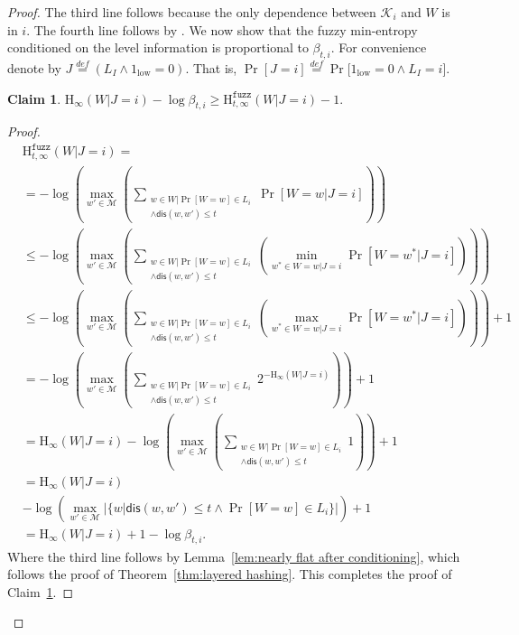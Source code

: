 \documentclass[11pt]{article}
\newtheorem{claim}[theorem]{Claim}
\newcommand{\thref}[1]{\mbox{Theorem~\ref{#1}}}
\newcommand{\lemref}[1]{\mbox{Lemma~\ref{#1}}}
\newcommand{\clref}[1]{\mbox{Claim~\ref{#1}}}
\newcommand{\dis}{\ensuremath{\mathsf{dis}}}
\newcommand{\Hoo}{\mathrm{H}_\infty}
\newcommand{\Hfuzz}{\mathrm{H}^{\mathtt{fuzz}}_{t,\infty}}
\begin{document}
\begin{proof}
\noindent
The third line follows because the only dependence between $\mathcal{K}_i$ and $W$ is in $i$.  The fourth line follows by \cite[Lemma 2.2]{DBLP:journals/siamcomp/DodisORS08}.  We now show that the fuzzy min-entropy conditioned on the level information is proportional to $\beta_{t, i}$.  For convenience denote by $J \overset{def}= (L_I \wedge 1_{\text{low}}=0)$.  That is, $\Pr[J=i] \overset{def}= \Pr[1_{\text{low}}=0 \wedge L_I=i$]. 
\begin{claim}
\label{cl:fuzz proportional beta}
$\Hoo(W |   J=i ) -\log \beta_{t, i} \ge \Hfuzz(W | J=i)-1.$
\end{claim}
\begin{proof}
\begin{align*}
&\Hfuzz(W|J=i) =\\&= -\log \left(\max_{w' \in \mathcal{M}} \left( \sum_{\substack{w\in W | \Pr[W=w]\in L_i \\\wedge \dis(w, w')\le t}} \Pr[W=w | J=i]\right) \right)\\
&\le -\log \left(\max_{w' \in \mathcal{M}} \left( \sum_{\substack{w\in W | \Pr[W=w]\in L_i \\\wedge \dis(w, w')\le t}}\left( \min_{w^*\in W=w| J=i}\Pr[W=w^* | J=i]\right) \right)\right)\\
&\le -\log \left(\max_{w' \in \mathcal{M}} \left( \sum_{\substack{w\in W | \Pr[W=w]\in L_i \\\wedge \dis(w, w')\le t}} \left(\max_{w^*\in W=w| J=i}\Pr[W=w^* | J=i]\right) \right)\right)+1\\
&= -\log \left(\max_{w' \in \mathcal{M}} \left( \sum_{\substack{w\in W | \Pr[W=w]\in L_i \\\wedge \dis(w, w')\le t}} 2^{-\Hoo(W|J=i)}\right) \right)+1\\
&= \Hoo(W|J=i)- \log\left(\max_{w' \in \mathcal{M}} \left( \sum_{\substack{w\in W | \Pr[W=w]\in L_i\\ \wedge \dis(w, w')\le t}} 1\right) \right)+1\\
&=\Hoo(W|J=i)\\&-  \log \left(\max_{w' \in \mathcal{M}} \left|\{w | \dis(w, w')\le t \wedge \Pr[W=w]\in L_i\}\right|\right)+1\\
&=\Hoo(W|J=i)+1-\log \beta_{t, i}.
\end{align*}
Where the third line follows by \lemref{lem:nearly flat after conditioning}, which follows the proof of \thref{thm:layered hashing}.  This completes the proof of \clref{cl:fuzz proportional beta}.
\end{proof}


\end{proof}
\end{document}
